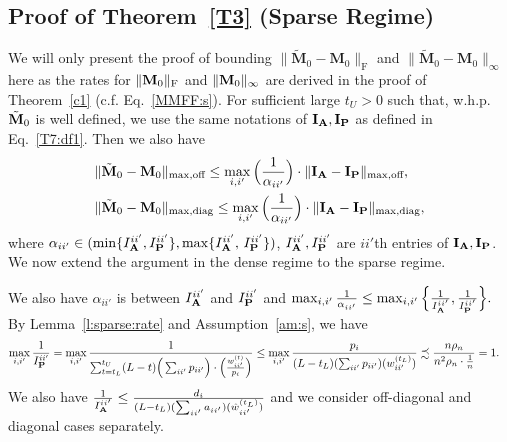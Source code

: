 \documentclass[10pt,journal,compsoc]{IEEEtran}
\newcommand{\ee}{\end{aligned} \end{equation}}
\newcommand{\bee}{\begin{equation}\begin{aligned}}
\newcommand{\M}[1]{{{\mathbf{\MakeUppercase{#1}}}}}
\newcommand{\F}{\mathrm{F}}
\numberwithin{equation}{section}
\begin{document}
\subsection{Proof of Theorem~\ref{T3} (Sparse Regime)}\label{pf:T3}
We will only present the proof of bounding $\|\tilde{\mathbf{M}}_0 -
\mathbf{M}_0 \|_{\F}$ and $\|\tilde{\mathbf{M}}_0 -
\mathbf{M}_0 \|_{\infty}$ here as the rates for $\|\M M_0\|_{\F}$ and $\|\M M_0\|_{\infty}$ are derived
in the proof of Theorem~\ref{c1} (c.f. Eq.~\eqref{MMFF:s}). 
For sufficient large $t_U > 0$ such that, w.h.p. $\tilde{\M M}_0$ is well defined, we use the same notations of $\M I_{\M A}, \M I_{\M P}$ as defined in Eq.~\eqref{T7:df1}. Then we also have
\bee\label{t:s:m:res1}
&\|\tilde{\M M}_0 - \M M_0\|_{\max,\text{off}} \leq\max_{i, i'}\Big(\frac{1}{\alpha_{ii'}}\Big)\cdot \|\M I_{\M A} - \M I_{\M P}\|_{\max,\text{off}},
\\
&\|\tilde{\M M}_0 - \M M_0\|_{\max,\text{diag}} \leq\max_{i,i'}\Big(\frac{1}{\alpha_{ii'}}\Big)\cdot \|\M I_{\M A} - \M I_{\M P}\|_{\max,\text{diag}},
\ee
where $\alpha_{ii'}\in (\min\{I^{ii'}_{\M A},I ^{ii'}_{\M P}\},\max\{I_{\M A}^{ii'},\, I_{\M P}^{ii'}\})$, $I^{ii'}_{\M A}, I^{ii'}_{\M P}$ are $ii'$th entries of $\M I_{\M A}, \M I_{\M P}$. We now extend the argument in the dense regime to the sparse regime. 

We also have $\alpha_{ii'}$ is between $I_{\M A}^{ii'}$ and $I_{\M P}^{ii'}$ and $\max_{i,i'}\frac{1}{\alpha_{ii'}}\leq \max_{i,i'}\Big\{\frac{1}{I^{ii'}_{\M A}},\frac{1}{I^{ii'}_{\M P}}\Big\}.$ By Lemma~\ref{l:sparse:rate} and Assumption~\ref{am:s}, we have
\bee\nonumber
\max_{i,i'}\frac{1}{I_{\M P}^{ii'}} &= \max_{i,i'}\frac{1}{\sum_{t = t_L}^{t_U}(L - t)\Big(\sum_{ii'}{p_{ii'}}\Big)\cdot\Big(\frac{{w}_{ii'}^{(t)}}{p_i}\Big)}
\leq \max_{i,i'}\frac{p_i}{(L-t_L)(\sum_{ii'}p_{ii'})(w^{(t_L)}_{ii'})}
\precsim \frac{n\rho_n}{n^2\rho_n\cdot \frac{1}{n}} = 1.
\ee
We also have $\frac{1}{I^{ii'}_{\M A}} \leq \frac{d_i}{(L-t_L)(\sum_{ii'}a_{ii'})(\hat{w}_{ii'}^{(t_L)})}$ and we consider off-diagonal and diagonal cases separately. 
\end{document}
